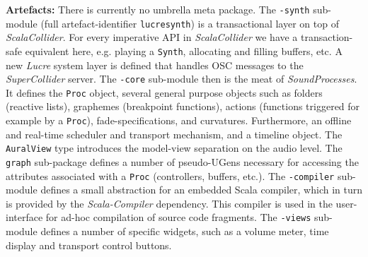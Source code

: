 \documentclass[11pt,a4paper]{article}
\newcommand{\software}[1]{\textit{#1}}
\begin{document}
\textbf{Artefacts:} There is currently no umbrella meta package. The \verb!-synth! sub-module (full artefact-identifier \verb!lucresynth!) is a transactional layer on top of \software{ScalaCollider}. For every imperative API in \software{ScalaCollider} we have a transaction-safe equivalent here, e.g. playing a \verb!Synth!, allocating and filling buffers, etc. A new \software{Lucre} system layer is defined that handles OSC messages to the \software{SuperCollider} server. The \verb!-core! sub-module then is the meat of \software{SoundProcesses}. It defines the \verb!Proc! object, several general purpose objects such as folders (reactive lists), graphemes (breakpoint functions), actions (functions triggered for example by a \verb!Proc!), fade-specifications, and curvatures. Furthermore, an offline and real-time scheduler and transport mechanism, and a timeline object. The \verb!AuralView! type introduces the model-view separation on the audio level. The \verb!graph! sub-package defines a number of pseudo-UGens necessary for accessing the attributes associated with a \verb!Proc! (controllers, buffers, etc.). The \verb!-compiler! sub-module defines a small abstraction for an embedded Scala compiler, which in turn is provided by the \software{Scala-Compiler} dependency. This compiler is used in the user-interface for ad-hoc compilation of source code fragments. The \verb!-views! sub-module defines a number of specific widgets, such as a volume meter, time display and transport control buttons.
\end{document}
